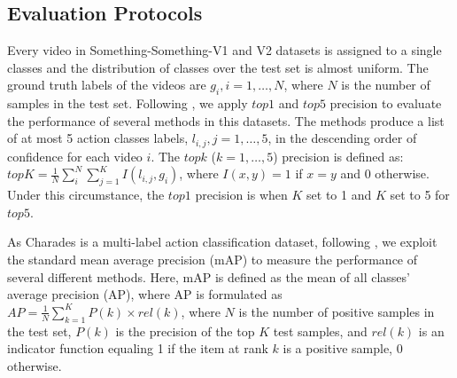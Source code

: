\documentclass[conference,compsoc]{IEEEtran}
\begin{document}
\subsection{Evaluation Protocols}
    Every video in Something-Something-V1 and V2 datasets is assigned to a single classes and the distribution of classes over the test set is almost uniform. The ground truth labels of the videos are $g_i, i=1, \ldots, N$, where $N$ is the number of samples in the test set. Following \cite{goyal2017something, wang2018videos, zhou2018temporal}, we apply $top1$ and $top5$ precision to evaluate the performance of several methods in this datasets. The methods produce a list of at most 5 action classes labels, $l_{i, j}, j=1, \ldots, 5$, in the descending order of confidence for each video $i$. The $topk$ ($k=1, \ldots, 5$) precision is defined as: $topK = \frac{1}{N} \sum_{i}^{N}\sum_{j=1}^{K} I(l_{i, j}, g_i)$, where $I(x, y)=1$ if $x=y$ and 0 otherwise. Under this circumstance, the $top1$ precision is when $K$ set to 1 and $K$ set to 5 for $top5$.
    
    As Charades is a multi-label action classification dataset, following \cite{sigurdsson2016hollywood, wang2018videos, zhou2018temporal}, we exploit the standard mean average precision (mAP) to measure the performance of several different methods. Here, mAP is defined as the mean of all classes' average precision (AP), where AP is formulated as $AP = \frac{1}{N}\sum_{k=1}^{K}P(k) \times rel(k)$, where $N$ is the number of positive samples in the test set, $P(k)$ is the precision of the top $K$ test samples, and $rel(k)$ is an indicator function equaling 1 if the item at rank $k$ is a positive sample, 0 otherwise.
 
\end{document}

